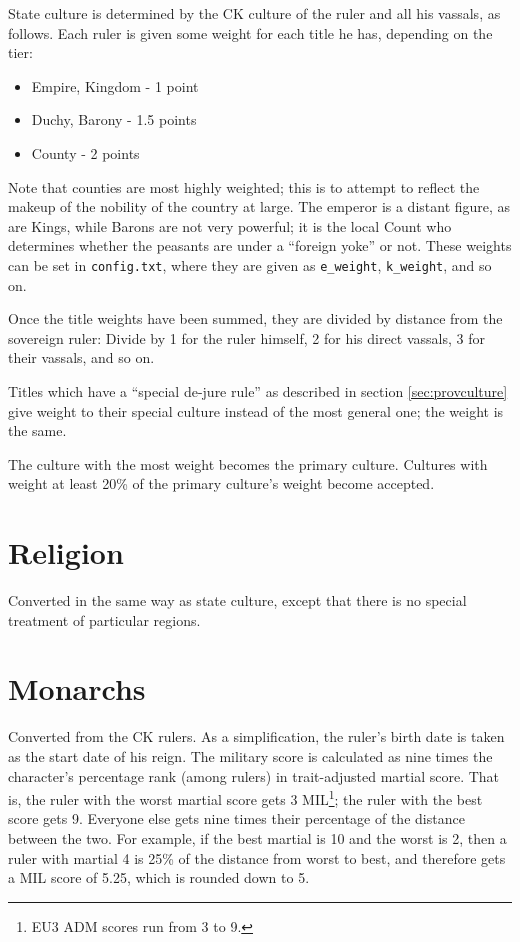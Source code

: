 \documentclass[12pt,ebook,oneside]{book}
\begin{document}
State culture is determined by the CK culture of the ruler and all his
vassals, as follows. Each ruler is given some weight for each title he
has, depending on the tier:
\begin{itemize}
\item Empire, Kingdom - 1 point
\item Duchy, Barony - 1.5 points
\item County - 2 points
\end{itemize}
Note that counties are most highly weighted; this is to attempt to
reflect the makeup of the nobility of the country at large. The
emperor is a distant figure, as are Kings, while Barons are not very
powerful; it is the local Count who
determines whether the peasants are under a ``foreign yoke'' or not.
These weights can be set in \verb|config.txt|, where they are given 
as \verb|e_weight|, \verb|k_weight|, and so on. 

Once the title weights have been summed, they are divided by distance
from the sovereign ruler: Divide by 1 for the ruler himself, 2 for his
direct vassals, 3 for their vassals, and so on. 

Titles which have a ``special de-jure rule'' as described in section
\ref{sec:provculture} give weight to their special culture instead of
the most general one; the weight is the same. 

The culture with the most weight becomes the primary culture. 
Cultures with weight at least 20\% of the primary culture's weight
become accepted. 

\section{Religion}

Converted in the same way as state culture, except that there is no
special treatment of particular regions. 

\section{Monarchs}

Converted from the CK rulers. As a simplification, the ruler's birth
date is taken as the start date of his reign. The military score is
calculated as nine times the character's percentage rank (among
rulers) in trait-adjusted martial score. That is, the ruler with the
worst martial score gets 3 MIL\footnote{EU3 ADM scores run from 3 to 9.}; the ruler with the best score gets
9. Everyone else gets nine times their percentage of the distance
between the two. For example, if the best martial is 10 and the worst is
2, then a ruler with martial 4 is 25\% of the distance from worst to
best, and therefore gets a MIL score of 5.25, which is rounded down to
5. 
\end{document}
